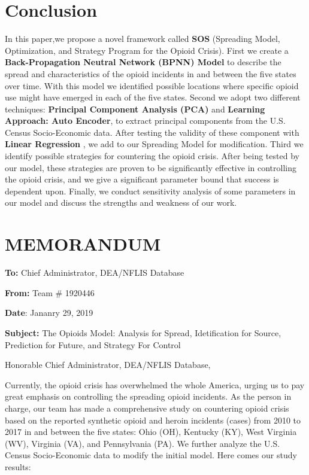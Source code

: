\documentclass{mcmthesis}
\begin{document}
\section{Conclusion} \label{Sec-Conclusion}
In this paper,we propose a novel framework called \textbf{SOS} (Spreading Model, Optimization, and Strategy Program for the Opioid Crisis). First we create a \textbf{Back-Propagation Neutral Network  (BPNN) Model} to describe the spread and characteristics of the opioid incidents in and between the five states over time. With this model we identified possible locations where specific opioid use might have emerged in each of the five states. Second we adopt two different techniques: \textbf{Principal Component Analysis (PCA)} and \textbf{Learning Approach: Auto Encoder}, to extract principal components from the U.S. Census Socio-Economic data. After testing the validity of these component with \textbf{Linear Regression} ,  we add to our Spreading Model for modification. Third we identify possible strategies for countering the opioid crisis. After being tested by our model, these strategies are proven to be significantly effective in controlling the opioid crisis, and we give a significant parameter bound that success is dependent upon. Finally, we conduct sensitivity analysis of some parameters in our model and discuss the strengths and weakness of our work.

\newpage
\section*{MEMORANDUM} 

\noindent\textbf{To:} Chief Administrator, DEA/NFLIS Database

\noindent\textbf{From:} Team \# 1920446

\noindent\textbf{Date}: Jananry 29, 2019

\noindent\textbf{Subject:} The Opioids Model: Analysis for Spread, Idetification for Source, Prediction for Future, and Strategy For Control

Honorable Chief Administrator, DEA/NFLIS Database, 

Currently, the opioid crisis has overwhelmed the whole America, urging us to pay great emphasis on controlling the spreading opioid incidents. As the person in charge, our team has made a comprehensive study on countering opioid crisis based on the reported synthetic opioid and heroin incidents (cases) from 2010 to 2017 in and between the five states: Ohio (OH), Kentucky (KY), West Virginia (WV), Virginia (VA), and Pennsylvania (PA). We further analyze the U.S. Census Socio-Economic data to modify the initial model. Here comes our study results:
\end{document}
